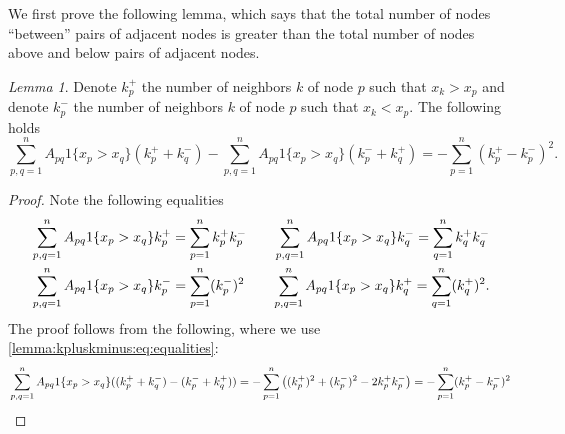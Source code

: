 \documentclass{article}
\theoremstyle{remark}
\newtheorem{lemma}{Lemma}
\begin{document}
We first prove the following lemma, which says that the total number of nodes ``between'' pairs of adjacent nodes is greater than the total number of nodes above and below pairs of adjacent nodes. 
\begin{lemma}{\label{lemma:kpluskminus}}
	Denote $k_p^+$ the number of neighbors $k$ of node $p$ such that $x_k>x_p$ and denote $k_p^-$ the number of neighbors $k$ of node $p$ such that $x_k<x_p$. The following holds
	\begin{equation}
		\sum_{p,q=1}^nA_{pq}1\{x_p>x_q\}(k_p^++k_q^-) - \sum_{p,q=1}^nA_{pq}1\{x_p>x_q\}(k_p^-+k_q^+) = -\sum_{p=1}^n(k_p^+-k_p^-)^2.
	\end{equation}
\end{lemma}
\begin{proof}
	Note the following equalities 
	\begin{equation}{\label{lemma:kpluskminus:eq:equalities}}
	\begin{aligned}
		&\sum_{p,q=1}^nA_{pq}1\{x_p>x_q\}k_p^+ = \sum_{p=1}^nk_p^+k_p^- \quad &\sum_{p,q=1}^nA_{pq}1\{x_p>x_q\}k_q^- = \sum_{q=1}^nk_q^+k_q^-\\
		&\sum_{p,q=1}^nA_{pq}1\{x_p>x_q\}k_p^- = \sum_{p=1}^n(k_p^-)^2 \quad &\sum_{p,q=1}^nA_{pq}1\{x_p>x_q\}k_q^+ = \sum_{q=1}^n(k_q^+)^2.
	\end{aligned}
	\end{equation}
	The proof follows from the following, where we use \eqref{lemma:kpluskminus:eq:equalities}: 
	\begin{equation}{\label{lemma:kpluskminus:eq:negative}}
		\sum_{p,q=1}^nA_{pq}1\{x_p>x_q\}((k_p^++k_q^-) - (k_p^-+k_q^+)) = -\sum_{p=1}^n\left((k_p^+)^2+(k_p^-)^2-2k_p^+k_p^-\right) = -\sum_{p=1}^n(k_p^+-k_p^-)^2 
	\end{equation}
\end{proof}
\end{document}
